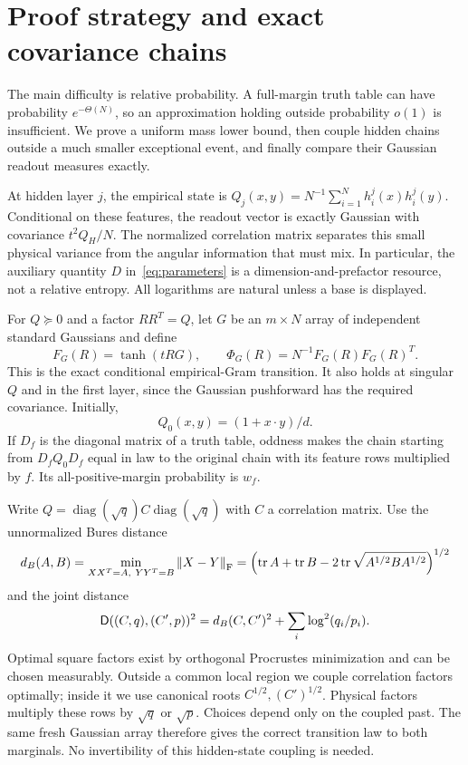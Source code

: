 \documentclass[11pt]{article}
\newcommand{\diag}{\operatorname{diag}}\newcommand{\sech}{\operatorname{sech}}
\newcommand{\norm}[1]{\left\lVert#1\right\rVert}
\begin{document}
\section{Proof strategy and exact covariance chains}
The main difficulty is relative probability. A full-margin truth table can have probability $e^{-\Theta(N)}$, so an approximation holding outside probability $o(1)$ is insufficient. We prove a uniform mass lower bound, then couple hidden chains outside a much smaller exceptional event, and finally compare their Gaussian readout measures exactly.

At hidden layer $j$, the empirical state is
$Q_j(x,y)=N^{-1}\sum_{i=1}^N h_i^j(x)h_i^j(y)$.
Conditional on these features, the readout vector is exactly Gaussian
with covariance $t^2Q_H/N$. The normalized correlation matrix separates
this small physical variance from the angular information that must mix.
In particular, the auxiliary quantity $D$ in~\eqref{eq:parameters}
is a dimension-and-prefactor resource, not a relative entropy.
All logarithms are natural unless a base is displayed.

For $Q\succeq0$ and a factor $RR^T=Q$, let $G$ be an $m\times N$ array of independent standard Gaussians and define
\begin{equation}\label{eq:transition}
 F_G(R)=\tanh(tRG),\qquad \Phi_G(R)=N^{-1}F_G(R)F_G(R)^T.
\end{equation}
This is the exact conditional empirical-Gram transition. It also holds at singular $Q$ and in the first layer, since the Gaussian pushforward has the required covariance. Initially,
\begin{equation}\label{eq:initial}
 Q_0(x,y)=(1+x\cdot y)/d.
\end{equation}
If $D_f$ is the diagonal matrix of a truth table, oddness makes the chain starting from $D_fQ_0D_f$ equal in law to the original chain with its feature rows multiplied by $f$. Its all-positive-margin probability is $w_f$.

Write $Q=\diag(\sqrt q)C\diag(\sqrt q)$ with $C$ a correlation matrix. Use the unnormalized Bures distance
\begin{equation}\label{eq:bures}
 d_B(A,B)=\min_{XX^T=A,\ YY^T=B}\norm{X-Y}_{\F}
 =\left(\tr A+\tr B-2\tr\sqrt{A^{1/2}BA^{1/2}}\right)^{1/2}
\end{equation}
and the joint distance
\begin{equation}\label{eq:joint}
 \mathsf D((C,q),(C',p))^2=d_B(C,C')^2+\sum_i\log^2(q_i/p_i).
\end{equation}
Optimal square factors exist by orthogonal Procrustes minimization and can be chosen measurably. Outside a common local region we couple correlation factors optimally; inside it we use canonical roots $C^{1/2},(C')^{1/2}$. Physical factors multiply these rows by $\sqrt q$ or $\sqrt p$. Choices depend only on the coupled past. The same fresh Gaussian array therefore gives the correct transition law to both marginals. No invertibility of this hidden-state coupling is needed.
\end{document}
